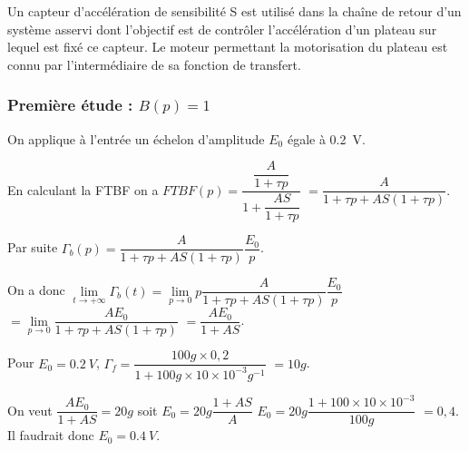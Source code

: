 Un capteur d'accélération de sensibilité S est utilisé dans la chaîne de retour d'un système asservi dont l'objectif est de contrôler l'accélération d'un plateau sur lequel est fixé ce capteur. Le moteur permettant la motorisation du plateau est connu par l'intermédiaire de sa fonction de transfert. 




\subsubsection*{Première étude : $B(p) = 1$}
On applique à l'entrée un échelon d'amplitude $E_0$ égale à \SI{0,2}{V}.

\ifprof
\begin{corrige}
En calculant la FTBF on a $FTBF(p)=\dfrac{\dfrac{A}{1+\tau p}}{1+\dfrac{AS}{1+\tau p}}$
$=\dfrac{A}{1+\tau p+AS\left(1+\tau p\right)}$.

Par suite $\Gamma_b(p) = \dfrac{A}{1+\tau p+AS\left(1+\tau p\right)} \dfrac{E_0}{p}$.

On a donc 
$\lim\limits_{t \to +\infty}\Gamma_b(t) =  \lim\limits_{p \to 0} p \dfrac{A}{1+\tau p+AS\left(1+\tau p\right)} \dfrac{E_0}{p} $
$=  \lim\limits_{p \to 0}  \dfrac{A E_0}{1+\tau p+AS\left(1+\tau p\right)} $
$=  \dfrac{A E_0}{1+AS} $.

Pour $E_0=\SI{0,2}{V}$, $\Gamma_f = \dfrac{100g\times 0,2}{1+100g\times 10\times 10^{-3}g^{-1}}$ 
$=10g$.


On veut $ \dfrac{A E_0}{1+AS} = 20g$ soit  
$ E_0 = 20g \dfrac{1+AS}{A}$ $E_0 = 20g \dfrac{1+100 \times 10 \times 10^{-3}}{100g}$
$= 0,4$. Il faudrait donc $E_0 = \SI{0,4}{V}$.




\end{corrige}
\else
\fi


